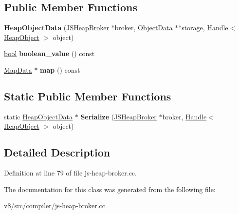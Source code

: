 \subsection*{Public Member Functions}
\begin{DoxyCompactItemize}
\item 
\mbox{\label{classv8_1_1internal_1_1compiler_1_1HeapObjectData_af2de5bcc62a31faccb247e2692d14720}} 
{\bfseries Heap\+Object\+Data} (\mbox{\hyperlink{classv8_1_1internal_1_1compiler_1_1JSHeapBroker}{J\+S\+Heap\+Broker}} $\ast$broker, \mbox{\hyperlink{classv8_1_1internal_1_1compiler_1_1ObjectData}{Object\+Data}} $\ast$$\ast$storage, \mbox{\hyperlink{classv8_1_1internal_1_1Handle}{Handle}}$<$ \mbox{\hyperlink{classv8_1_1internal_1_1HeapObject}{Heap\+Object}} $>$ object)
\item 
\mbox{\label{classv8_1_1internal_1_1compiler_1_1HeapObjectData_a6af39ea10aa95aecd11dd0b711df781a}} 
\mbox{\hyperlink{classbool}{bool}} {\bfseries boolean\+\_\+value} () const
\item 
\mbox{\label{classv8_1_1internal_1_1compiler_1_1HeapObjectData_acad8fb8dbf469c383f2d65cd5c1d87ba}} 
\mbox{\hyperlink{classv8_1_1internal_1_1compiler_1_1MapData}{Map\+Data}} $\ast$ {\bfseries map} () const
\end{DoxyCompactItemize}
\subsection*{Static Public Member Functions}
\begin{DoxyCompactItemize}
\item 
\mbox{\label{classv8_1_1internal_1_1compiler_1_1HeapObjectData_ae2d15c0e33d5aa8ee0c45453aac7b4f5}} 
static \mbox{\hyperlink{classv8_1_1internal_1_1compiler_1_1HeapObjectData}{Heap\+Object\+Data}} $\ast$ {\bfseries Serialize} (\mbox{\hyperlink{classv8_1_1internal_1_1compiler_1_1JSHeapBroker}{J\+S\+Heap\+Broker}} $\ast$broker, \mbox{\hyperlink{classv8_1_1internal_1_1Handle}{Handle}}$<$ \mbox{\hyperlink{classv8_1_1internal_1_1HeapObject}{Heap\+Object}} $>$ object)
\end{DoxyCompactItemize}


\subsection{Detailed Description}


Definition at line 79 of file js-\/heap-\/broker.\+cc.



The documentation for this class was generated from the following file\+:\begin{DoxyCompactItemize}
\item 
v8/src/compiler/js-\/heap-\/broker.\+cc\end{DoxyCompactItemize}
